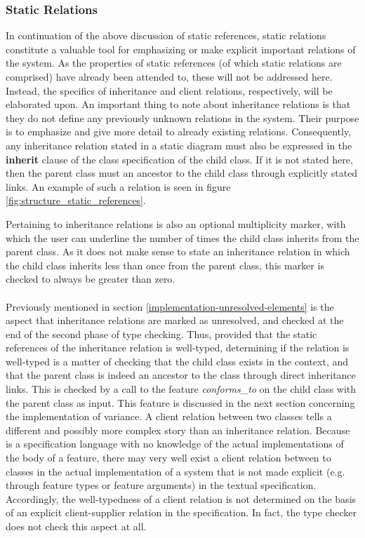 \subsubsection{Static Relations}
In continuation of the above discussion of static references, static relations constitute a valuable tool for emphasizing or make explicit important relations of the system. As the properties of static references (of which static relations are comprised) have already been attended to, these will not be addressed here. Instead, the specifics of inheritance and client relations, respectively, will be elaborated upon.
An important thing to note about inheritance relations is that they do not define any previously unknown relations in the system. Their purpose is to emphasize and give more detail to already existing relations. Consequently, any inheritance relation stated in a static diagram must also be expressed in the \textbf{inherit} clause of the class specification of the child class. If it is not stated here, then the parent class must an ancestor to the child class through explicitly stated links. An example of such a relation is seen in figure \ref{fig:structure_static_references}.

Pertaining to inheritance relations is also an optional multiplicity marker, with which the user can underline the number of times the child class inherits from the parent class. As it does not make sense to state an inheritance relation in which the child class inherits less than once from the parent class, this marker is checked to always be greater than zero.
\paragraph{}
Previously mentioned in section \ref{implementation-unresolved-elements} is the aspect that inheritance relations are marked as unresolved, and checked at the end of the second phase of type checking. Thus, provided that the static references of the inheritance relation is well-typed, determining if the relation is well-typed is a matter of checking that the child class exists in the context, and that the parent class is indeed an ancestor to the class through direct inheritance links. This is checked by a call to the feature \textit{conforms\_to} on the child class with the parent class as input. This feature is discussed in the next section concerning the implementation of variance. 
A client relation between two classes tells a different and possibly more complex story than an inheritance relation. Because \bon{} is a specification language with no knowledge of the actual implementations of the body of a feature, there may very well exist a client relation between to classes in the actual implementation of a system that is not made explicit (e.g. through feature types or feature arguments) in the textual \bon{} specification. Accordingly, the well-typedness of a client relation is not determined on the basis of an explicit client-supplier relation in the specification. In fact, the type checker does not check this aspect at all.
